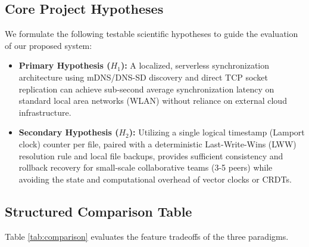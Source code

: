 \documentclass[11pt,oneside]{article}
\begin{document}
\subsection{Core Project Hypotheses}
We formulate the following testable scientific hypotheses to guide the evaluation of our proposed system:
\begin{itemize}
    \item \textbf{Primary Hypothesis ($H_1$):} A localized, serverless synchronization architecture using mDNS/DNS-SD discovery and direct TCP socket replication can achieve sub-second average synchronization latency on standard local area networks (WLAN) without reliance on external cloud infrastructure.
    \item \textbf{Secondary Hypothesis ($H_2$):} Utilizing a single logical timestamp (Lamport clock) counter per file, paired with a deterministic Last-Write-Wins (LWW) resolution rule and local file backups, provides sufficient consistency and rollback recovery for small-scale collaborative teams (3-5 peers) while avoiding the state and computational overhead of vector clocks or CRDTs.
\end{itemize}

\subsection{Structured Comparison Table}
Table \ref{tab:comparison} evaluates the feature tradeoffs of the three paradigms.
\end{document}
